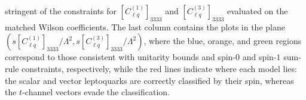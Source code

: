 \begin{table}[htbp]
{    stringent of the constraints for $[C_{\ell q}^{(1)}]_{3333}$ and $[C_{\ell q}^{(3)}]_{3333}$ evaluated on the
    matched Wilson coefficients. The last column contains the plots in the plane $(s[C_{\ell q}^{(1)}]_{3333}/\Lambda^2, s[C_{\ell q}^{(3)}]_{3333}/\Lambda^2)$, where the blue, orange, and green regions correspond to those consistent with unitarity bounds and spin-$0$ and spin-$1$ sum-rule constraints, respectively, while the red lines indicate where each model lies: the scalar and vector leptoquarks are correctly classified by
    their spin, whereas the $t$-channel vectors evade the classification.}
    \label{tab:models}
\end{table}
